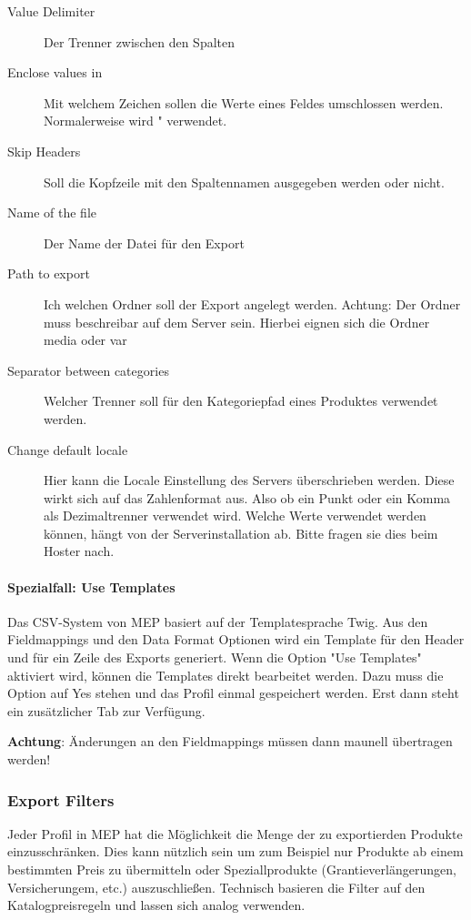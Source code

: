 \documentclass[a4paper,12pt]{book}
\begin{document}
\begin{description}
\item[Value Delimiter] Der Trenner zwischen den Spalten
\item[Enclose values in] Mit welchem Zeichen sollen die Werte eines
Feldes umschlossen werden. Normalerweise wird " verwendet.
\item[Skip Headers] Soll die Kopfzeile mit den Spaltennamen ausgegeben
werden oder nicht.
\item[Name of the file] Der Name der Datei für den Export
\item[Path to export] Ich welchen Ordner soll der Export angelegt
werden. Achtung: Der Ordner muss beschreibar auf dem Server sein.
Hierbei eignen sich die Ordner media oder var
\item[Separator between categories] Welcher Trenner soll für den
Kategoriepfad eines Produktes verwendet werden.
\item[Change default locale] Hier kann die Locale Einstellung des
Servers überschrieben werden. Diese wirkt sich auf das Zahlenformat
aus. Also ob ein Punkt oder ein Komma als Dezimaltrenner verwendet
wird. Welche Werte verwendet werden können, hängt von der
Serverinstallation ab. Bitte fragen sie dies beim Hoster nach.
\end{description}


\paragraph{Spezialfall: Use Templates}
Das CSV-System von MEP basiert auf der Templatesprache Twig. Aus den
Fieldmappings und den Data Format Optionen wird ein Template für den
Header und für ein Zeile des Exports generiert. Wenn die Option "Use
Templates" aktiviert wird, können die Templates direkt bearbeitet
werden. Dazu muss die Option auf Yes stehen und das Profil einmal
gespeichert werden. Erst dann steht ein zusätzlicher Tab zur Verfügung.

\textbf{Achtung}: Änderungen an den Fieldmappings müssen dann maunell
übertragen werden!

\subsubsection{Export Filters}
Jeder Profil in MEP hat die Möglichkeit die Menge der zu exportierden
Produkte einzusschränken. Dies kann nützlich sein um zum Beispiel nur
Produkte ab einem bestimmten Preis zu übermitteln oder
Speziallprodukte (Grantieverlängerungen, Versicherungem, etc.)
auszuschließen. Technisch basieren die Filter auf den
Katalogpreisregeln und lassen sich analog verwenden.
\end{document}
